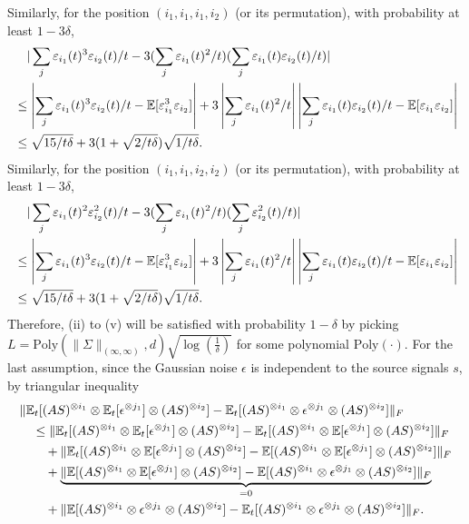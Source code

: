 Similarly, for the position $(i_1,i_1,i_1,i_2)$ (or its permutation), with probability at least $1-3\delta$,
\begin{align*}
&\quad |\sum_j \varepsilon_{i_1}(t)^3\varepsilon_{i_2}(t)/t - 3(\sum_j \varepsilon_{i_1}(t)^2/t)(\sum_j \varepsilon_{i_1}(t)\varepsilon_{i_2}(t)/t)| \\
& \le \left|\sum_j \varepsilon_{i_1}(t)^3\varepsilon_{i_2}(t)/t -  \mathbb{E}[\varepsilon_{i_1}^3 \varepsilon_{i_2}]\right| +3\left|\sum_j \varepsilon_{i_1}(t)^2/t\right|\left|\sum_j \varepsilon_{i_1}(t)\varepsilon_{i_2}(t)/t - \mathbb{E}[\varepsilon_{i_1}\varepsilon_{i_2}]\right| \\
& \le \sqrt{15/t\delta}+ 3(1+\sqrt{2/t\delta})\sqrt{1/t\delta}.
\end{align*}
Similarly, for the position $(i_1,i_1,i_2,i_2)$ (or its permutation), with probability at least $1-3\delta$,
\begin{align*}
&\quad |\sum_j \varepsilon_{i_1}(t)^2\varepsilon_{i_2}^2(t)/t - 3(\sum_j \varepsilon_{i_1}(t)^2/t)(\sum_j \varepsilon_{i_2}^2(t)/t)| \\
& \le \left|\sum_j \varepsilon_{i_1}(t)^3\varepsilon_{i_2}(t)/t -  \mathbb{E}[\varepsilon_{i_1}^3 \varepsilon_{i_2}]\right| +3\left|\sum_j \varepsilon_{i_1}(t)^2/t\right|\left|\sum_j \varepsilon_{i_1}(t)\varepsilon_{i_2}(t)/t - \mathbb{E}[\varepsilon_{i_1}\varepsilon_{i_2}]\right| \\
& \le \sqrt{15/t\delta}+ 3(1+\sqrt{2/t\delta})\sqrt{1/t\delta}.
\end{align*}
Therefore, (ii) to (v) will be satisfied with probability $1-\delta$ by picking $L = \text{Poly}(\|\Sigma\|_{(\infty,\infty)}, d)\sqrt{\log(\frac{1}{\delta})}$ for some polynomial $\text{Poly}(\cdot)$.
\fi
For the last assumption, since the Gaussian noise $\epsilon$ is independent to the source signals $s$, by triangular inequality 
\begin{align*}
&\|\mathbb{E}_t[(AS)^{\otimes i_1}\otimes \mathbb{E}_t[\epsilon^{\otimes j_1}] \otimes (AS)^{\otimes i_2}] - \mathbb{E}_t[(AS)^{\otimes i_1}\otimes \epsilon^{\otimes j_1}\otimes (AS)^{\otimes i_2}]  \|_F \\
& \quad \le  \|\mathbb{E}_t[(AS)^{\otimes i_1}\otimes \mathbb{E}_t[\epsilon^{\otimes j_1}] \otimes (AS)^{\otimes i_2}] - \mathbb{E}_t[(AS)^{\otimes i_1}\otimes \mathbb{E}[\epsilon^{\otimes j_1}] \otimes (AS)^{\otimes i_2}] \|_F \\
& \quad \quad + \| \mathbb{E}_t[(AS)^{\otimes i_1}\otimes \mathbb{E}[\epsilon^{\otimes j_1}] \otimes (AS)^{\otimes i_2}] - \mathbb{E}[(AS)^{\otimes i_1}\otimes \mathbb{E}[\epsilon^{\otimes j_1}] \otimes (AS)^{\otimes i_2}] \|_F \\
& \quad \quad + \underbrace{\|\mathbb{E}[(AS)^{\otimes i_1}\otimes \mathbb{E}[\epsilon^{\otimes j_1}] \otimes (AS)^{\otimes i_2}]  - \mathbb{E}[(AS)^{\otimes i_1}\otimes \epsilon^{\otimes j_1}\otimes (AS)^{\otimes i_2}] \|_F}_{=0} \\
& \quad \quad + \| \mathbb{E}[(AS)^{\otimes i_1}\otimes \epsilon^{\otimes j_1}\otimes (AS)^{\otimes i_2}] - \mathbb{E}_t[(AS)^{\otimes i_1}\otimes \epsilon^{\otimes j_1}\otimes (AS)^{\otimes i_2}] \|_F.
\end{align*}
